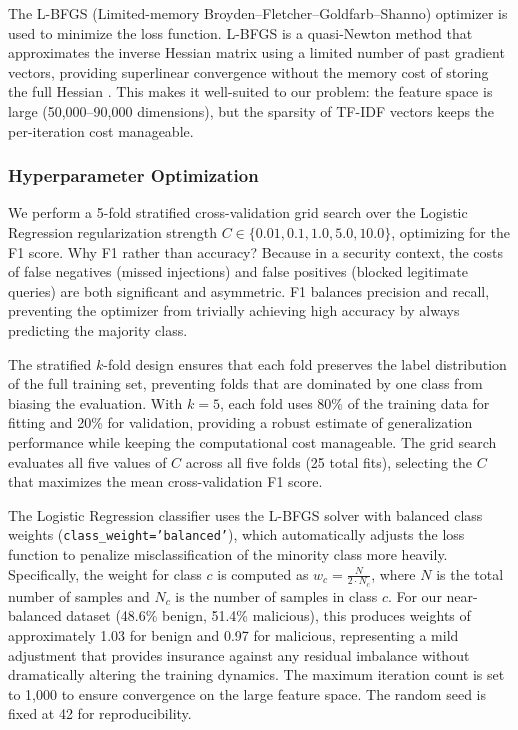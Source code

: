 \documentclass[12pt, letterpaper]{article}   %
\begin{document}
The L-BFGS (Limited-memory Broyden--Fletcher--Goldfarb--Shanno) optimizer is used to minimize the loss function. L-BFGS is a quasi-Newton method that approximates the inverse Hessian matrix using a limited number of past gradient vectors, providing superlinear convergence without the memory cost of storing the full Hessian \cite{ref27}. This makes it well-suited to our problem: the feature space is large (50,000--90,000 dimensions), but the sparsity of TF-IDF vectors keeps the per-iteration cost manageable.

\subsubsection{Hyperparameter Optimization}

We perform a 5-fold stratified cross-validation grid search over the Logistic Regression regularization strength $C \in \{0.01, 0.1, 1.0, 5.0, 10.0\}$, optimizing for the F1 score. Why F1 rather than accuracy? Because in a security context, the costs of false negatives (missed injections) and false positives (blocked legitimate queries) are both significant and asymmetric. F1 balances precision and recall, preventing the optimizer from trivially achieving high accuracy by always predicting the majority class.

The stratified $k$-fold design ensures that each fold preserves the label distribution of the full training set, preventing folds that are dominated by one class from biasing the evaluation. With $k=5$, each fold uses 80\% of the training data for fitting and 20\% for validation, providing a robust estimate of generalization performance while keeping the computational cost manageable. The grid search evaluates all five values of $C$ across all five folds (25 total fits), selecting the $C$ that maximizes the mean cross-validation F1 score.

The Logistic Regression classifier uses the L-BFGS solver with balanced class weights (\texttt{class\_weight='balanced'}), which automatically adjusts the loss function to penalize misclassification of the minority class more heavily. Specifically, the weight for class $c$ is computed as $w_c = \frac{N}{2 \cdot N_c}$, where $N$ is the total number of samples and $N_c$ is the number of samples in class $c$. For our near-balanced dataset (48.6\% benign, 51.4\% malicious), this produces weights of approximately 1.03 for benign and 0.97 for malicious, representing a mild adjustment that provides insurance against any residual imbalance without dramatically altering the training dynamics. The maximum iteration count is set to 1,000 to ensure convergence on the large feature space. The random seed is fixed at 42 for reproducibility.
\end{document}
